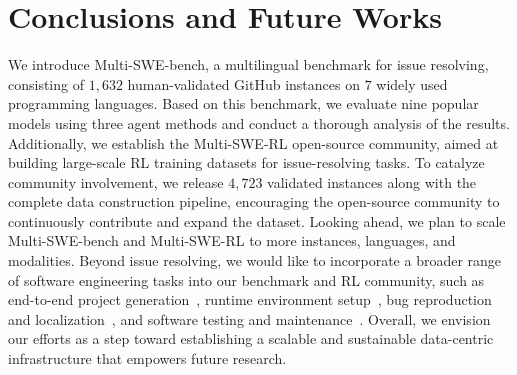 \documentclass[11pt, a4paper, logo, copyright, nonumbering]{seed}
\newcommand{\multiswebench}{Multi-SWE-bench\xspace}
\newcommand{\multiswerl}{Multi-SWE-RL\xspace}
\begin{document}


\section{Conclusions and Future Works}
We introduce \multiswebench, a multilingual benchmark for issue resolving, consisting of $1,632$ human-validated GitHub instances on $7$ widely used programming languages. 
Based on this benchmark, we evaluate nine popular models using three agent methods and conduct a thorough analysis of the results.
Additionally, we establish the \multiswerl open-source community, aimed at building large-scale RL training datasets for issue-resolving tasks.
To catalyze community involvement, we release $4,723$ validated instances along with the complete data construction pipeline, encouraging the open-source community to continuously contribute and expand the dataset.
Looking ahead, we plan to scale \multiswebench and \multiswerl to more instances, languages, and modalities.
Beyond issue resolving, we would like to incorporate a broader range of software engineering tasks into our benchmark and RL community,
such as end-to-end project generation~\citep{zan2024codes,paperbench}, runtime environment setup~\citep{env_3,env_1,env_2}, bug reproduction~\citep{bug_2,bug_3} and localization~\citep{bug_1}, and software testing and maintenance~\citep{test_1,test_2}.
Overall, we envision our efforts as a step toward establishing a scalable and sustainable data-centric infrastructure that empowers future research.


\newpage
\end{document}
